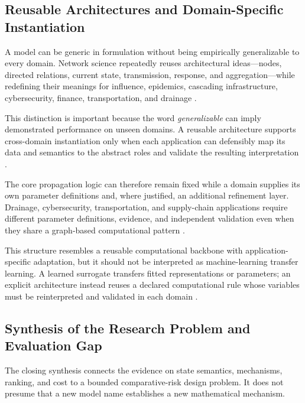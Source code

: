 



\subsection{Reusable Architectures and Domain-Specific
Instantiation}\label{generic-core-and-domain-specific-instantiation}

A model can be generic in formulation without being empirically
generalizable to every domain. Network science repeatedly reuses
architectural ideas---nodes, directed relations, current state,
transmission, response, and aggregation---while redefining their meanings
for influence, epidemics, cascading infrastructure, cybersecurity,
finance, transportation, and drainage \citep{kempe2003,kermack1927,
buldyrev2010,sheyner2002,faraji2026,petrone2018,simone2022}.

This distinction is important because the word \emph{generalizable} can
imply demonstrated performance on unseen domains. A reusable architecture
supports cross-domain instantiation only when each application can
defensibly map its data and semantics to the abstract roles and validate
the resulting interpretation \citep{kavallieratos2021,faraji2026,
petrone2018}.

The core propagation logic can therefore remain fixed while a domain
supplies its own parameter definitions and, where justified, an
additional refinement layer. Drainage, cybersecurity, transportation,
and supply-chain applications require different parameter definitions,
evidence, and independent validation even when they share a graph-based
computational pattern \citep{kavallieratos2021,zhou2023,petrone2018,
dastgir2023}.

This structure resembles a reusable computational backbone with
application-specific adaptation, but it should not be interpreted as
machine-learning transfer learning. A learned surrogate transfers fitted
representations or parameters; an explicit architecture instead reuses a
declared computational rule whose variables must be reinterpreted and
validated in each domain \citep{zhang2024}.

\subsection{Synthesis of the Research Problem and Evaluation Gap}
The closing synthesis connects the evidence on state semantics, mechanisms,
ranking, and cost to a bounded comparative-risk design problem. It does not
presume that a new model name establishes a new mathematical mechanism.

